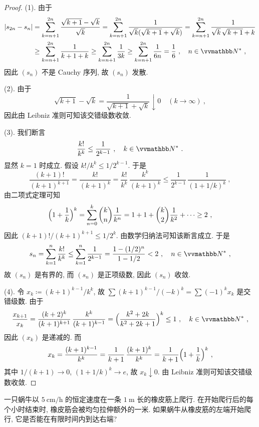 \begin{proof}
    (1). 由于
    \begin{align*}
        |s_{2 n} - s_n| &= \sum_{k = n + 1}^{2 n} \frac{\sqrt{k + 1} - \sqrt{k}}{\sqrt{k}} = \sum_{k = n + 1}^{2 n} \frac{1}{\sqrt{k} (\sqrt{k + 1} + \sqrt{k})} = \sum_{k = n + 1}^{2 n} \frac{1}{\sqrt{k}\, \sqrt{k + 1} + k}\\
        &\geq \sum_{k = n + 1}^{2 n} \frac{1}{k + 1 + k} \geq \sum_{k = n + 1}^{2 n} \frac{1}{3 k} \geq \sum_{k = n + 1}^{2 n} \frac{1}{6 n} = \frac{1}{6}\ ,\quad n \in \N^\ast\ ,
    \end{align*}
    因此 \((s_n)\) 不是 Cauchy 序列, 故 \((s_n)\) 发散.

    (2). 由于
    \[
        \sqrt{k + 1} - \sqrt{k} = \frac{1}{\sqrt{k + 1} + \sqrt{k}} \downarrow 0\quad (k \to \infty)\ ,
    \]
    因此由 Leibniz 准则可知该交错级数收敛.

    (3). 我们断言
    \[
        \frac{k!}{k^k} \leq \frac{1}{2^{k - 1}}\ ,\quad k \in \N^\ast\ .
    \]
    显然 \(k = 1\) 时成立. 假设 \(k! / k^k \leq 1 / 2^{k - 1}\). 于是
    \[
        \frac{(k + 1)!}{(k + 1)^{k + 1}} = \frac{k!}{(k + 1)^k} = \frac{k!}{k^k}\, \frac{k^k}{(k + 1)^k} \leq \frac{1}{2^{k - 1}}\, \frac{1}{(1 + 1 / k)^k}\ ,
    \]
    由二项式定理可知
    \[
        \Bigl(1 + \frac{1}{k}\Bigr)^k = \sum_{n = 0}^k \binom{k}{n} \frac{1}{k^n} = 1 + 1 + \binom{k}{2} \frac{1}{k^2} + \cdots \geq 2\ ,
    \]
    因此 \((k + 1)! / (k + 1)^{k + 1} \leq 1 / 2^k\). 由数学归纳法可知该断言成立. 于是
    \[
        s_n = \sum_{k = 1}^n \frac{k!}{k^k} \leq \sum_{k = 1}^n \frac{1}{2^{k - 1}} = \frac{1 - (1 / 2)^n}{1 - 1 / 2} < 2\ ,\quad n \in \N^\ast\ ,
    \]
    故 \((s_n)\) 是有界的, 而 \((s_n)\) 是正项级数, 因此 \((s_n)\) 收敛.

    (4). 令 \(x_k \coloneqq (k + 1)^{k - 1} / k^k\), 故 \(\sum (k + 1)^{k - 1} / (- k)^k = \sum (- 1)^k x_k\) 是交错级数. 由于
    \[
        \frac{x_{k + 1}}{x_k} = \frac{(k + 2)^k}{(k + 1)^{k + 1}}\, \frac{k^k}{(k + 1)^{k - 1}} = \Bigl(\frac{k^2 + 2 k}{k^2 + 2 k + 1}\Bigr)^k \leq 1\ ,\quad k \in \N^\ast\ ,
    \]
    因此 \((x_k)\) 是递减的. 而
    \[
        x_k = \frac{(k + 1)^{k - 1}}{k^k} = \frac{1}{k + 1}\, \frac{(k + 1)^k}{k^k} = \frac{1}{k + 1} \Bigl(1 + \frac{1}{k}\Bigr)^k\ ,
    \]
    其中 \(1 / (k + 1) \to 0\), \((1 + 1 / k)^k \to e\), 故 \(x_k \downarrow 0\). 由 Leibniz 准则可知该交错级数收敛.
\end{proof}

\begin{exercise}
    一只蜗牛以 \(\SI{5}{\centi\meter\per\hour}\) 的恒定速度在一条 \(\SI{1}{\meter}\) 长的橡皮筋上爬行. 在开始爬行后的每个小时结束时, 橡皮筋会被均匀拉伸额外的一米. 如果蜗牛从橡皮筋的左端开始爬行, 它是否能在有限时间内到达右端?
\end{exercise}

